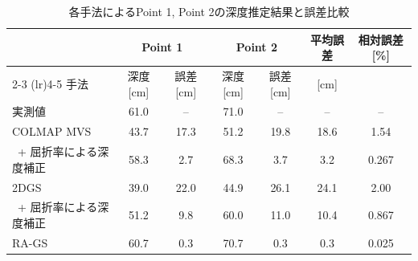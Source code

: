 \begin{table}[htbp]
  \centering
  \caption{各手法によるPoint 1, Point 2の深度推定結果と誤差比較}
  \label{tab:depth_error_comparison}
  \begin{tabular}{lcccccc}
    \toprule
    & \multicolumn{2}{c}{Point 1} & \multicolumn{2}{c}{Point 2} & 平均誤差 & 相対誤差 [\%] \\
    \cmidrule(lr){2-3} \cmidrule(lr){4-5}
    手法 & 深度 [cm] & 誤差 [cm] & 深度 [cm] & 誤差 [cm] & [cm] & \\
    \midrule
    実測値 & 61.0 & -- & 71.0 & -- & -- & -- \\
    COLMAP MVS & 43.7 & 17.3 & 51.2 & 19.8 & 18.6 & 1.54 \\
    ~+ 屈折率による深度補正 & 58.3 & 2.7 & 68.3 & 3.7 & 3.2 & 0.267 \\
    2DGS & 39.0 & 22.0 & 44.9 & 26.1 & 24.1 & 2.00 \\
    ~+ 屈折率による深度補正 & 51.2 & 9.8 & 60.0 & 11.0 & 10.4 & 0.867 \\
    RA-GS & 60.7 & 0.3 & 70.7 & 0.3 & 0.3 & 0.025 \\
    \bottomrule
  \end{tabular}
\end{table}